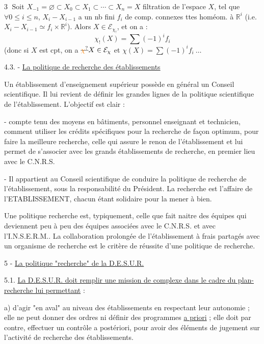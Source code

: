 \textcircled{3} Soit $X_{-1}=\varnothing\subset X_0\subset X_1\subset\cdots\subset X_n=X$ filtration de l'espace $X$, tel que $\forall 0\leq i\leq n$, $X_i-X_{i-1}$  a un nb fini $f_i$ de comp. connexes ttes homéom. à $\mathbb R^i$ (i.e. $X_i-X_{i-1}\simeq f_i\times\mathbb R^i$). Alors $X\in\mathcal E_{\chi_!}$, et on a :
\[
\chi_!(X)=\sum(-1)^i f_i
\]
(donc si $X$ est cpt, on a $\deleted{\unsure{\chi}}X\in\mathcal E_\chi$ et $\chi(X)=\sum(-1)^i f_i\ \ldots$



4.3. - \uline{La politique de recherche des établissements}

Un établissement d'enseignement supérieur possède en général un Conseil scientifique. Il lui revient de définir les grandes lignes de la politique scientifique de l'établissement. L'objectif est clair :

- compte tenu des moyens en bâtiments, personnel enseignant et technicien, comment utiliser les crédits spécifiques pour la recherche de façon optimum, pour faire la meilleure recherche, celle qui assure le renon de l'établissement et lui permet de s'associer avec les grands établissements de recherche, en premier lieu avec le C.N.R.S.

- Il appartient au Conseil scientifique de conduire la politique de recherche de l'établissement, sous la responsabilité du Président. La recherche est l'affaire de l'ETABLISSEMENT, chacun étant solidaire pour la mener à bien.

Une politique recherche est, typiquement, celle que fait naitre des équipes qui deviennent peu à peu des équipes associées avec le C.N.R.S. et avec l'I.N.S.E.R.M.. La collaboration prolongée de l'établissement à frais partagés avec un organisme de recherche est le critère de réussite d'une politique de recherche.

5 - \uline{La politique "recherche" de la D.E.S.U.R.}

5.1. \uline{La D.E.S.U.R. doit remplir une mission de complexe dans le cadre du plan-recherche lui permettant} :

a) d'agir "en aval" au niveau des établissements en respectant leur autonomie ; elle ne peut donner des ordres ni définir des programmes \uline{a priori} ; elle doit par contre, effectuer un contrôle a postériori, pour avoir des éléments de jugement sur l'activité de recherche des établissements.

